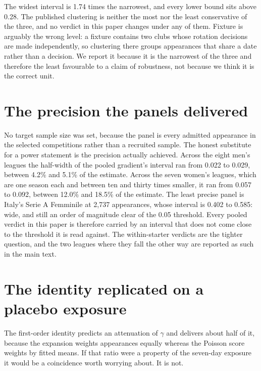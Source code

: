 \documentclass[11pt]{article}
\begin{document}
The widest interval is 1.74 times the narrowest, and every lower bound sits above 0.28. The published clustering is neither the most nor the least conservative of the three, and no verdict in this paper changes under any of them. Fixture is arguably the wrong level: a fixture contains two clubs whose rotation decisions are made independently, so clustering there groups appearances that share a date rather than a decision. We report it because it is the narrowest of the three and therefore the least favourable to a claim of robustness, not because we think it is the correct unit.

\section{The precision the panels delivered}

No target sample size was set, because the panel is every admitted appearance in the selected competitions rather than a recruited sample. The honest substitute for a power statement is the precision actually achieved. Across the eight men's leagues the half-width of the pooled gradient's interval ran from 0.022 to 0.029, between 4.2\% and 5.1\% of the estimate. Across the seven women's leagues, which are one season each and between ten and thirty times smaller, it ran from 0.057 to 0.092, between 12.0\% and 18.5\% of the estimate. The least precise panel is Italy's Serie A Femminile at 2,737 appearances, whose interval is 0.402 to 0.585: wide, and still an order of magnitude clear of the 0.05 threshold. Every pooled verdict in this paper is therefore carried by an interval that does not come close to the threshold it is read against. The within-starter verdicts are the tighter question, and the two leagues where they fall the other way are reported as such in the main text.

\section{The identity replicated on a placebo exposure}

The first-order identity predicts an attenuation of $\gamma$ and delivers about half of it, because the expansion weights appearances equally whereas the Poisson score weights by fitted means. If that ratio were a property of the seven-day exposure it would be a coincidence worth worrying about. It is not.
\end{document}
